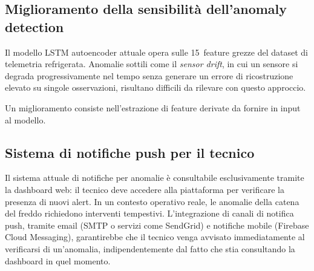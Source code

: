 \subsection{Miglioramento della sensibilità dell'anomaly detection}

Il modello LSTM autoencoder attuale opera sulle 15~feature grezze del dataset di telemetria refrigerata. Anomalie sottili come il \emph{sensor drift}, in cui un sensore si degrada progressivamente nel tempo senza generare un errore di ricostruzione elevato su singole osservazioni, risultano difficili da rilevare con questo approccio.

Un miglioramento consiste nell'estrazione di feature derivate da fornire in input al modello.




\subsection{Sistema di notifiche push per il tecnico}

Il sistema attuale di notifiche per anomalie è consultabile esclusivamente tramite la dashboard web: il tecnico deve accedere alla piattaforma per verificare la presenza di nuovi alert. In un contesto operativo reale, le anomalie della catena del freddo richiedono interventi tempestivi. L'integrazione di canali di notifica push, tramite email (SMTP o servizi come SendGrid) e notifiche mobile (Firebase Cloud Messaging), garantirebbe che il tecnico venga avvisato immediatamente al verificarsi di un'anomalia, indipendentemente dal fatto che stia consultando la dashboard in quel momento.

